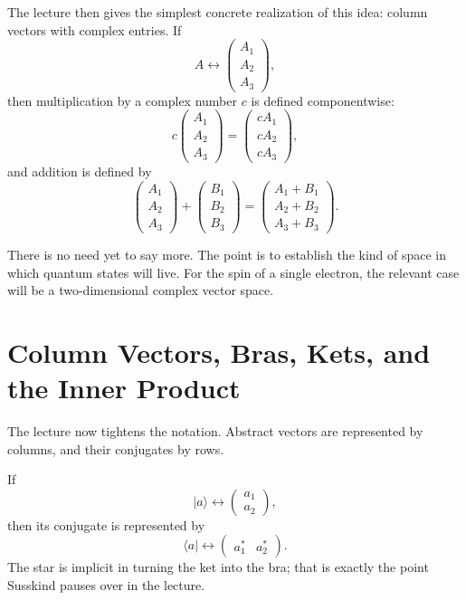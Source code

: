 The lecture then gives the simplest concrete realization of this idea: column vectors with complex entries. If
\[
A \leftrightarrow \begin{pmatrix}A_1\\A_2\\A_3\end{pmatrix},
\]
then multiplication by a complex number \(c\) is defined componentwise:
\begin{equation}
c\begin{pmatrix}A_1\\A_2\\A_3\end{pmatrix}
=
\begin{pmatrix}cA_1\\cA_2\\cA_3\end{pmatrix},
\end{equation}
and addition is defined by
\begin{equation}
\begin{pmatrix}A_1\\A_2\\A_3\end{pmatrix}
+
\begin{pmatrix}B_1\\B_2\\B_3\end{pmatrix}
=
\begin{pmatrix}A_1+B_1\\A_2+B_2\\A_3+B_3\end{pmatrix}.
\end{equation}

There is no need yet to say more. The point is to establish the kind of space in which quantum states will live. For the spin of a single electron, the relevant case will be a two-dimensional complex vector space.

\section{Column Vectors, Bras, Kets, and the Inner Product}

The lecture now tightens the notation. Abstract vectors are represented by columns, and their conjugates by rows.

If
\[
|a\rangle \leftrightarrow \begin{pmatrix}a_1\\a_2\end{pmatrix},
\]
then its conjugate is represented by
\[
\langle a| \leftrightarrow \begin{pmatrix}a_1^* & a_2^*\end{pmatrix}.
\]
The star is implicit in turning the ket into the bra; that is exactly the point Susskind pauses over in the lecture.

